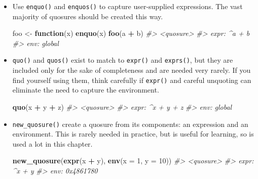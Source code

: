 \documentclass[]{book}
\makeatletter
\newenvironment{Shaded}{\begin{snugshade}}{\end{snugshade}}
\newcommand{\CommentTok}[1]{\textcolor[rgb]{0.37,0.37,0.37}{\textit{#1}}}
\newcommand{\ControlFlowTok}[1]{\textcolor[rgb]{0.27,0.27,0.27}{\textbf{#1}}}
\newcommand{\DataTypeTok}[1]{\textcolor[rgb]{0.27,0.27,0.27}{#1}}
\newcommand{\DecValTok}[1]{\textcolor[rgb]{0.06,0.06,0.06}{#1}}
\newcommand{\KeywordTok}[1]{\textcolor[rgb]{0.27,0.27,0.27}{\textbf{#1}}}
\newcommand{\NormalTok}[1]{#1}
\newcommand{\OperatorTok}[1]{\textcolor[rgb]{0.43,0.43,0.43}{\textbf{#1}}}
\newcommand{\StringTok}[1]{\textcolor[rgb]{0.5,0.5,0.5}{#1}}
\newcommand{\indexc}[1]{\index{#1@\texttt{#1}}}
\makeatother
\begin{document}
\begin{itemize}
\item
  Use \texttt{enquo()} and \texttt{enquos()} to capture user-supplied expressions.
  The vast majority of quosures should be created this way.

\begin{Shaded}
\begin{Highlighting}[]
\NormalTok{foo <-}\StringTok{ }\ControlFlowTok{function}\NormalTok{(x) }\KeywordTok{enquo}\NormalTok{(x)}
\KeywordTok{foo}\NormalTok{(a }\OperatorTok{+}\StringTok{ }\NormalTok{b)}
\CommentTok{#> <quosure>}
\CommentTok{#> expr: ^a + b}
\CommentTok{#> env:  global}
\end{Highlighting}
\end{Shaded}

  \indexc{enquo()}
\item
  \texttt{quo()} and \texttt{quos()} exist to match to \texttt{expr()} and \texttt{exprs()}, but
  they are included only for the sake of completeness and are needed very
  rarely. If you find yourself using them, think carefully if \texttt{expr()} and
  careful unquoting can eliminate the need to capture the environment.

\begin{Shaded}
\begin{Highlighting}[]
\KeywordTok{quo}\NormalTok{(x }\OperatorTok{+}\StringTok{ }\NormalTok{y }\OperatorTok{+}\StringTok{ }\NormalTok{z)}
\CommentTok{#> <quosure>}
\CommentTok{#> expr: ^x + y + z}
\CommentTok{#> env:  global}
\end{Highlighting}
\end{Shaded}

\item
  \texttt{new\_quosure()} create a quosure from its components: an expression and
  an environment. This is rarely needed in practice, but is useful for
  learning, so is used a lot in this chapter.

\begin{Shaded}
\begin{Highlighting}[]
\KeywordTok{new_quosure}\NormalTok{(}\KeywordTok{expr}\NormalTok{(x }\OperatorTok{+}\StringTok{ }\NormalTok{y), }\KeywordTok{env}\NormalTok{(}\DataTypeTok{x =} \DecValTok{1}\NormalTok{, }\DataTypeTok{y =} \DecValTok{10}\NormalTok{))}
\CommentTok{#> <quosure>}
\CommentTok{#> expr: ^x + y}
\CommentTok{#> env:  0x4861780}
\end{Highlighting}
\end{Shaded}
\end{itemize}
\end{document}
